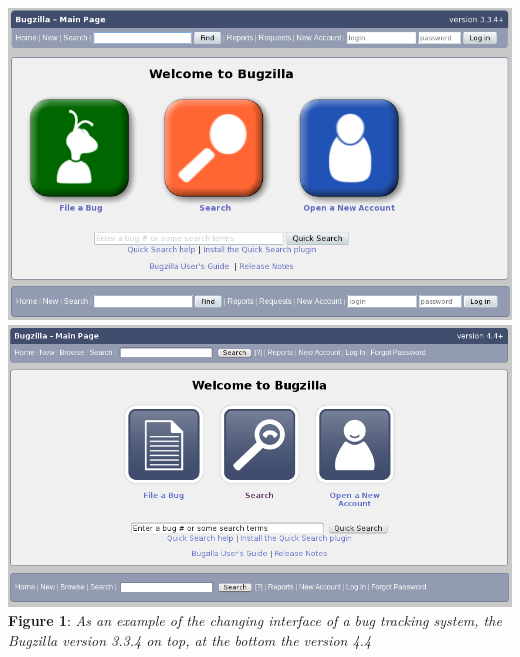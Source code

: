 \includegraphics[width=1.0\textwidth]{bugzilla334} \\\includegraphics[width=1.0\textwidth]{bugzilla44}  \\\textbf{Figure 1}: \textit{As an example of the changing interface of a bug tracking system, the Bugzilla version 3.3.4 on top, at the bottom the version 4.4}
\newpage

